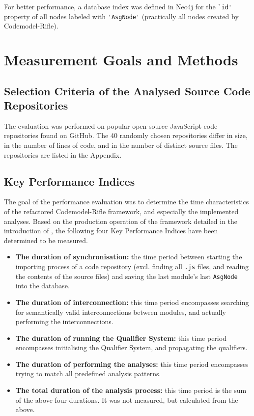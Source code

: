 For better performance, a database index was defined in Neo4j for the \lstinline{`id'} property of all nodes labeled with \lstinline{'AsgNode'} (practically all nodes created by Codemodel-Rifle).


\section{Measurement Goals and Methods}

\subsection{Selection Criteria of the Analysed Source Code Repositories}

The evaluation was performed on popular open-source JavaScript code repositories found on GitHub. The 40 randomly chosen repositories differ in size, in the number of lines of code, and in the number of distinct source files. The repositories are listed in the Appendix.


\subsection{Key Performance Indices}

The goal of the performance evaluation was to determine the time characteristics of the refactored Codemodel-Rifle framework, and especially the implemented analyses. Based on the production operation of the framework detailed in the introduction of , the following four Key Performance Indices have been determined to be measured.

\begin{itemize}
\item \textbf{The duration of synchronisation:} the time period between starting the importing process of a code repository (excl. finding all \lstinline{.js} files, and reading the contents of the source files) and saving the last module's last \lstinline{AsgNode} into the database.
\item \textbf{The duration of interconnection:} this time period encompasses searching for semantically valid interconnections between modules, and actually performing the interconnections.
\item \textbf{The duration of running the Qualifier System:} this time period encompasses initialising the Qualifier System, and propagating the qualifiers.
\item \textbf{The duration of performing the analyses:} this time period encompasses trying to match all predefined analysis patterns.
\item \textbf{The total duration of the analysis process:} this time period is the sum of the above four durations. It was not measured, but calculated from the above.
\end{itemize}

